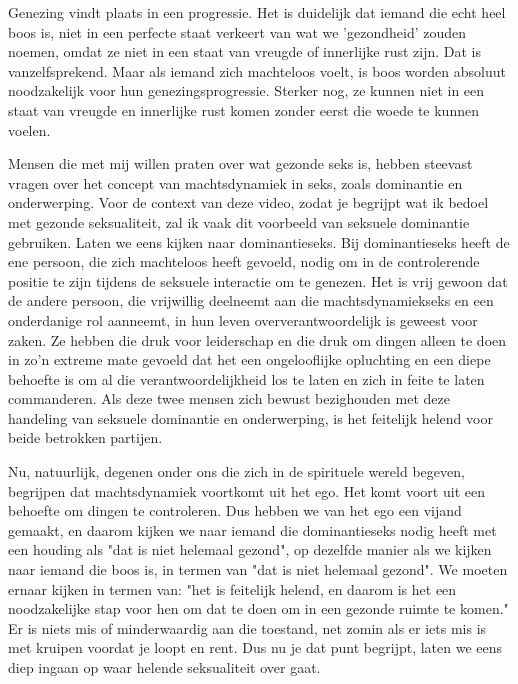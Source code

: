 Genezing vindt plaats in een progressie. Het is duidelijk dat iemand die echt heel boos is, niet in een perfecte staat verkeert van wat we 'gezondheid' zouden noemen, omdat ze niet in een staat van vreugde of innerlijke rust zijn. Dat is vanzelfsprekend. Maar als iemand zich machteloos voelt, is boos worden absoluut noodzakelijk voor hun genezingsprogressie. Sterker nog, ze kunnen niet in een staat van vreugde en innerlijke rust komen zonder eerst die woede te kunnen voelen.

Mensen die met mij willen praten over wat gezonde seks is, hebben steevast vragen over het concept van machtsdynamiek in seks, zoals dominantie en onderwerping. Voor de context van deze video, zodat je begrijpt wat ik bedoel met gezonde seksualiteit, zal ik vaak dit voorbeeld van seksuele dominantie gebruiken. Laten we eens kijken naar dominantieseks. Bij dominantieseks heeft de ene persoon, die zich machteloos heeft gevoeld, nodig om in de controlerende positie te zijn tijdens de seksuele interactie om te genezen. Het is vrij gewoon dat de andere persoon, die vrijwillig deelneemt aan die machtsdynamiekseks en een onderdanige rol aanneemt, in hun leven oververantwoordelijk is geweest voor zaken. Ze hebben die druk voor leiderschap en die druk om dingen alleen te doen in zo'n extreme mate gevoeld dat het een ongelooflijke opluchting en een diepe behoefte is om al die verantwoordelijkheid los te laten en zich in feite te laten commanderen. Als deze twee mensen zich bewust bezighouden met deze handeling van seksuele dominantie en onderwerping, is het feitelijk helend voor beide betrokken partijen.

Nu, natuurlijk, degenen onder ons die zich in de spirituele wereld begeven, begrijpen dat machtsdynamiek voortkomt uit het ego. Het komt voort uit een behoefte om dingen te controleren. Dus hebben we van het ego een vijand gemaakt, en daarom kijken we naar iemand die dominantieseks nodig heeft met een houding als "dat is niet helemaal gezond", op dezelfde manier als we kijken naar iemand die boos is, in termen van "dat is niet helemaal gezond". We moeten ernaar kijken in termen van: "het is feitelijk helend, en daarom is het een noodzakelijke stap voor hen om dat te doen om in een gezonde ruimte te komen." Er is niets mis of minderwaardig aan die toestand, net zomin als er iets mis is met kruipen voordat je loopt en rent. Dus nu je dat punt begrijpt, laten we eens diep ingaan op waar helende seksualiteit over gaat.

